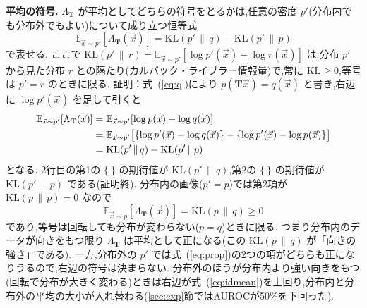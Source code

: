 \documentclass[MIRU,submit,onecolumn]{miru2025j}
\newcommand{\E}{\mathbb{E}}
\newcommand{\KL}{\mathrm{KL}}
\newcommand{\mT}{\mathbf{T}}            %
\renewcommand{\eqref}[1]{(\ref{#1})}   %
\begin{document}
\textbf{平均の符号.}
$\Lambda_{\mT}$ が平均としてどちらの符号をとるかは,任意の密度 $p'$(分布内でも分布外でもよい)について成り立つ恒等式
\begin{equation}
\E_{\vec{x}\sim p'}[\Lambda_{\mT}(\vec{x})]=\KL(p'\,\|\,q)-\KL(p'\,\|\,p)
\label{eq:prop}
\end{equation}
で表せる. ここで $\KL(p'\,\|\,r)=\E_{\vec{x}\sim p'}[\log p'(\vec{x})-\log r(\vec{x})]$ は,分布 $p'$ から見た分布 $r$ との隔たり(カルバック・ライブラー情報量)で,常に $\KL\ge0$,等号は $p'=r$ のときに限る. %
証明：式~\eqref{eq:q}により $p(\mT\vec{x})=q(\vec{x})$ と書き,右辺に $\log p'(\vec{x})$ を足して引くと
\begin{align}
\E_{\vec{x}\sim p'}[\Lambda_{\mT}(\vec{x})]&=\E_{\vec{x}\sim p'}[\log p(\vec{x})-\log q(\vec{x})]\notag\\
&=\E_{\vec{x}\sim p'}\big[\{\log p'(\vec{x})-\log q(\vec{x})\}-\{\log p'(\vec{x})-\log p(\vec{x})\}\big]\notag\\
&=\KL(p'\,\|\,q)-\KL(p'\,\|\,p)
\label{eq:proof}
\end{align}
となる. 2行目の第1の $\{\ \}$ の期待値が $\KL(p'\,\|\,q)$,第2の $\{\ \}$ の期待値が $\KL(p'\,\|\,p)$ である(証明終). %
分布内の画像($p'=p$)では第2項が $\KL(p\,\|\,p)=0$ なので
\begin{equation}
\E_{\vec{x}\sim p}[\Lambda_{\mT}(\vec{x})]=\KL(p\,\|\,q)\ge0
\label{eq:idmean}
\end{equation}
であり,等号は回転しても分布が変わらない($p=q$)ときに限る. %
つまり分布内のデータが向きをもつ限り $\Lambda_{\mT}$ は平均として正になる(この $\KL(p\,\|\,q)$ が「向きの強さ」である). %
一方,分布外の $p'$ では式~\eqref{eq:prop}の2つの項がどちらも正になりうるので,右辺の符号は決まらない. %
分布外のほうが分布内より強い向きをもつ(回転で分布が大きく変わる)ときは右辺が式~\eqref{eq:idmean}を上回り,分布内と分布外の平均の大小が入れ替わる(\ref{sec:exp}節ではAUROCが50\%を下回った).
\end{document}
